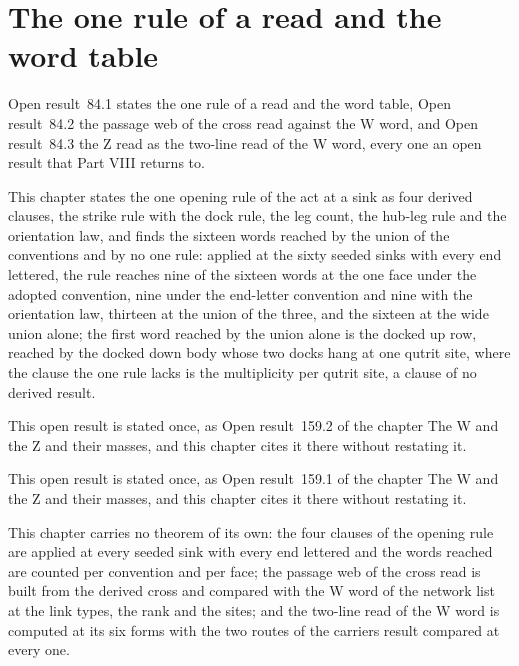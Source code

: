\section{The one rule of a read and the word table}\label{mod:IV-9-one-rule-of-a-read-and-the-word-table}
\label{narr:open:4-9}Open result~84.1 states the one rule of a read and the word table, Open result~84.2 the passage web of the cross read against the W word, and Open result~84.3 the Z read as the two-line read of the W word, every one an open result that Part VIII returns to.
\begin{chwall}\label{box:IV-9-one-rule-of-a-read-and-the-word-table:1}
This chapter states the one opening rule of the act at a sink as four derived clauses, the strike rule with the dock rule, the leg count, the hub-leg rule and the orientation law, and finds the sixteen words reached by the union of the conventions and by no one rule: applied at the sixty seeded sinks with every end lettered, the rule reaches nine of the sixteen words at the one face under the adopted convention, nine under the end-letter convention and nine with the orientation law, thirteen at the union of the three, and the sixteen at the wide union alone; the first word reached by the union alone is the docked up row, reached by the docked down body whose two docks hang at one qutrit site, where the clause the one rule lacks is the multiplicity per qutrit site, a clause of no derived result.
\end{chwall}
\begin{chwall}\label{box:IV-9-one-rule-of-a-read-and-the-word-table:2}
This open result is stated once, as Open result~159.2 of the chapter The W and the Z and their masses, and this chapter cites it there without restating it.
\end{chwall}
\begin{chwall}\label{box:IV-9-one-rule-of-a-read-and-the-word-table:3}
This open result is stated once, as Open result~159.1 of the chapter The W and the Z and their masses, and this chapter cites it there without restating it.
\end{chwall}
This chapter carries no theorem of its own: the four clauses of the opening rule are applied at every seeded sink with every end lettered and the words reached are counted per convention and per face; the passage web of the cross read is built from the derived cross and compared with the W word of the network list at the link types, the rank and the sites; and the two-line read of the W word is computed at its six forms with the two routes of the carriers result compared at every one.

